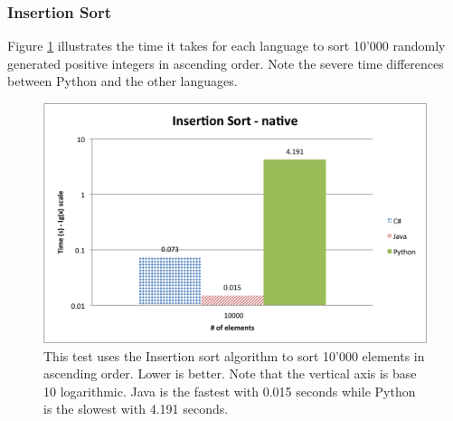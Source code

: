 \subsubsection{Insertion Sort}

Figure \ref{fig:native_insertion_sort} illustrates the time it takes for each language to sort 10'000 randomly generated positive integers in ascending order. Note the severe time differences between Python and the other languages.

\begin{figure}[h]
	\centering
	\includegraphics[width=1.0\linewidth]{chapters/new_media/InsertionSortNative.png}
	\caption{This test uses the Insertion sort algorithm to sort 10'000 elements in ascending order. Lower is better. Note that the vertical axis is base 10 logarithmic. Java is the fastest with 0.015 seconds while Python is the slowest with 4.191 seconds. }
	\label{fig:native_insertion_sort}
\end{figure}
